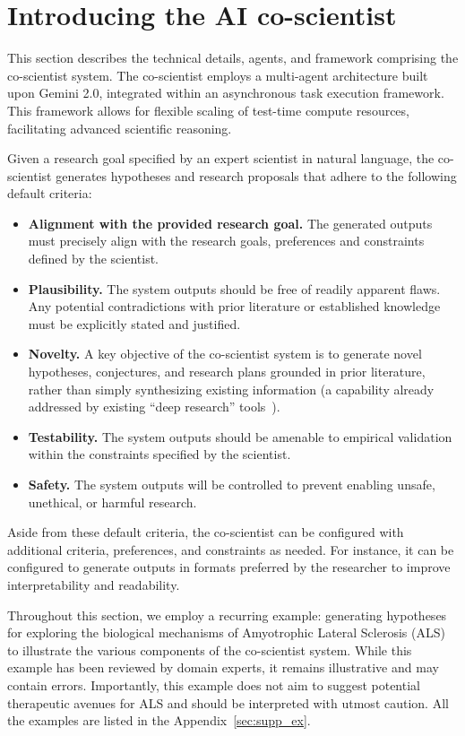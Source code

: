 \section{Introducing the AI co-scientist}
\label{sec:methods}

This section describes the technical details, agents, and framework comprising the co-scientist system. The co-scientist employs a multi-agent architecture built upon Gemini 2.0, integrated within an asynchronous task execution framework. This framework allows for flexible scaling of test-time compute resources, facilitating advanced scientific reasoning.

Given a research goal specified by an expert scientist in natural language, the co-scientist generates hypotheses and research proposals that adhere to the following default criteria:

\begin{itemize}
    \item \textbf{Alignment with the provided research goal.} The generated outputs must precisely align with the research goals, preferences and constraints defined by the scientist.
    \item \textbf{Plausibility.} The system outputs should be free of readily apparent flaws. Any potential contradictions with prior literature or established knowledge must be explicitly stated and justified.
    \item \textbf{Novelty.} A key objective of the co-scientist system is to generate novel hypotheses, conjectures, and research plans grounded in prior literature, rather than simply synthesizing existing information (a capability already addressed by existing ``deep research'' tools~\citep{jones2025openai}).
    \item \textbf{Testability.} The system outputs should be amenable to empirical validation within the constraints specified by the scientist.
    \item \textbf{Safety.} The system outputs will be controlled to prevent enabling unsafe, unethical, or harmful research.
\end{itemize}

Aside from these default criteria, the co-scientist can be configured with additional criteria, preferences, and constraints as needed. For instance, it can be configured to generate outputs in formats preferred by the researcher to improve interpretability and readability.

Throughout this section, we employ a recurring example: generating hypotheses for exploring the biological mechanisms of Amyotrophic Lateral Sclerosis (ALS) to illustrate the various components of the co-scientist system. While this example has been reviewed by domain experts, it remains illustrative and may contain errors. Importantly, this example does not aim to suggest potential therapeutic avenues for ALS and should be interpreted with utmost caution. All the examples are listed in the Appendix~\cref{sec:supp_ex}.

